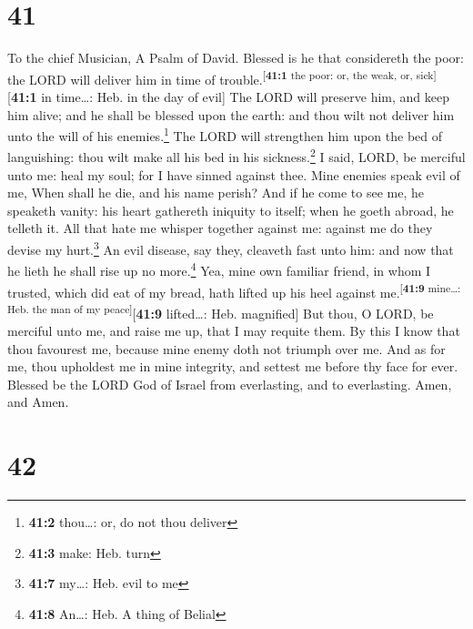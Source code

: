 \hypertarget{section-40}{%
\section{41}\label{section-40}}

To the chief Musician, A Psalm of David.  Blessed is he
that considereth the poor: the LORD will deliver him in time of
trouble.\textsuperscript{{[}\textbf{41:1} the poor: or, the weak, or,
sick{]}}{[}\textbf{41:1} in time\ldots: Heb. in the day of evil{]}
 The LORD will preserve him, and keep him alive; and he
shall be blessed upon the earth: and thou wilt not deliver him unto the
will of his enemies.\footnote{\textbf{41:2} thou\ldots: or, do not thou
  deliver}  The LORD will strengthen him upon the bed of
languishing: thou wilt make all his bed in his sickness.\footnote{\textbf{41:3}
  make: Heb. turn}  I said, LORD, be merciful unto me:
heal my soul; for I have sinned against thee.  Mine
enemies speak evil of me, When shall he die, and his name perish?
 And if he come to see me, he speaketh vanity: his heart
gathereth iniquity to itself; when he goeth abroad, he telleth it.
 All that hate me whisper together against me: against me
do they devise my hurt.\footnote{\textbf{41:7} my\ldots: Heb. evil to me}
 An evil disease, say they, cleaveth fast unto him: and
now that he lieth he shall rise up no more.\footnote{\textbf{41:8}
  An\ldots: Heb. A thing of Belial}  Yea, mine own
familiar friend, in whom I trusted, which did eat of my bread, hath
lifted up his heel against me.\textsuperscript{{[}\textbf{41:9}
mine\ldots: Heb. the man of my peace{]}}{[}\textbf{41:9} lifted\ldots:
Heb. magnified{]}  But thou, O LORD, be merciful unto me,
and raise me up, that I may requite them.  By this I know
that thou favourest me, because mine enemy doth not triumph over me.
 And as for me, thou upholdest me in mine integrity, and
settest me before thy face for ever.  Blessed be the LORD
God of Israel from everlasting, and to everlasting. Amen, and Amen.

\hypertarget{section-41}{%
\section{42}\label{section-41}}


